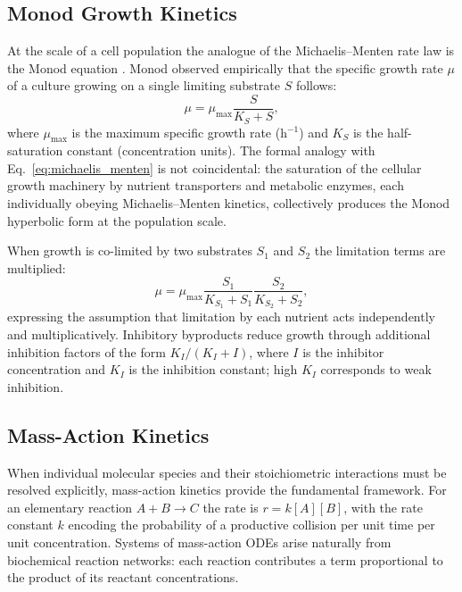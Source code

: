 \subsection{Monod Growth Kinetics}

At the scale of a cell population the analogue of the Michaelis--Menten rate
law is the Monod equation \cite{Monod1949}.  Monod observed empirically that
the specific growth rate $\mu$ of a culture growing on a single limiting
substrate $S$ follows:
\begin{equation}\label{eq:monod}
  \mu = \mu_{\max}\frac{S}{K_S + S},
\end{equation}
where $\mu_{\max}$ is the maximum specific growth rate (h$^{-1}$) and $K_S$
is the half-saturation constant (concentration units).  The formal analogy with
Eq.~\eqref{eq:michaelis_menten} is not coincidental: the saturation of the
cellular growth machinery by nutrient transporters and metabolic enzymes, each
individually obeying Michaelis--Menten kinetics, collectively produces the
Monod hyperbolic form at the population scale.

When growth is co-limited by two substrates $S_1$ and $S_2$ the limitation
terms are multiplied:
\begin{equation}\label{eq:monod_dual}
  \mu = \mu_{\max}
        \frac{S_1}{K_{S_1} + S_1}
        \frac{S_2}{K_{S_2} + S_2},
\end{equation}
expressing the assumption that limitation by each nutrient acts independently
and multiplicatively.  Inhibitory byproducts reduce growth through
additional inhibition factors of the form $K_I/(K_I + I)$, where $I$ is the
inhibitor concentration and $K_I$ is the inhibition constant; high $K_I$
corresponds to weak inhibition.

\subsection{Mass-Action Kinetics}

When individual molecular species and their stoichiometric interactions must
be resolved explicitly, mass-action kinetics provide the fundamental framework.
For an elementary reaction $A + B \to C$ the rate is $r = k[A][B]$, with the
rate constant $k$ encoding the probability of a productive collision per unit
time per unit concentration.  Systems of mass-action ODEs arise naturally from
biochemical reaction networks: each reaction contributes a term proportional to
the product of its reactant concentrations.

